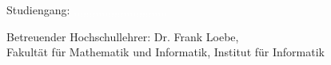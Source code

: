 \begin{titlepage}
\begin{addmargin}[-1cm]{-3cm}
\begin{flushright}
        \noindent
        Studiengang: \textcolor{white}{,,,,,,,,,,,,,,,,,,,,,,,,,,,,,,}\\
        \vspace{2pt}
        
        \noindent
         \textcolor{white}{}
    \end{flushright}
    
    \vfill
    
    
    \begin{center}
        Betreuender Hochschullehrer: Dr. Frank Loebe,\\
        Fakultät für Mathematik und Informatik, Institut für Informatik
    \end{center}
    
  \end{addmargin}
\end{titlepage}
